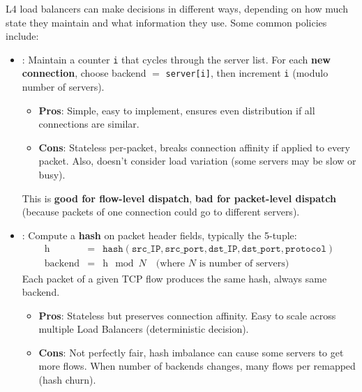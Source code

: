 \highspace
\begin{flushleft}
\end{flushleft}
L4 load balancers can make decisions in different ways, depending on how much state they maintain and what information they use. Some common policies include:
\begin{itemize}
    \item {}: Maintain a counter \texttt{i} that cycles through the server list. For each \textbf{new connection}, choose backend $=$ \texttt{server[i]}, then increment \texttt{i} (modulo number of servers).
    \begin{itemize}
        \item[\textcolor{Green3}{\faIcon{check}}] \textcolor{Green3}{\textbf{Pros}}: Simple, easy to implement, ensures even distribution if all connections are similar.
        \item[\textcolor{Red2}{\faIcon{times}}] \textcolor{Red2}{\textbf{Cons}}: Stateless per-packet, breaks connection affinity if applied to every packet. Also, doesn't consider load variation (some servers may be slow or busy).
    \end{itemize}
    This is \textbf{good for flow-level dispatch}, \textbf{bad for packet-level dispatch} (because packets of one connection could go to different servers).


    \item {}: Compute a \textbf{hash} on packet header fields, typically the 5-tuple:
    \begin{equation*}
        \begin{array}{rcl}
            \text{h} & = & \texttt{hash}\left(\texttt{src\_IP}, \texttt{src\_port}, \texttt{dst\_IP}, \texttt{dst\_port}, \texttt{protocol}\right) \\[.3em]
            \text{backend} & = & \text{h} \mod N \quad \text{(where $N$ is number of servers)}
        \end{array}
    \end{equation*}
    Each packet of a given TCP flow produces the same hash, always same backend.
    \begin{itemize}
        \item[\textcolor{Green3}{\faIcon{check}}] \textcolor{Green3}{\textbf{Pros}}: Stateless but preserves connection affinity. Easy to scale across multiple Load Balancers (deterministic decision).
        \item[\textcolor{Red2}{\faIcon{times}}] \textcolor{Red2}{\textbf{Cons}}: Not perfectly fair, hash imbalance can cause some servers to get more flows. When number of backends changes, many flows per remapped (hash churn).


\end{itemize}
\end{itemize}
